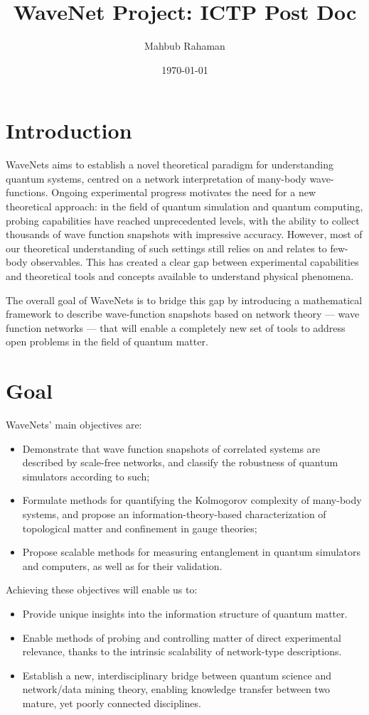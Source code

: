 \documentclass[a4paper, 11pt]{article}
\title{WaveNet Project: ICTP Post Doc}
\author{Mahbub Rahaman}
\date{\today}
\begin{document}
\maketitle

\section{Introduction}

WaveNets aims to establish a novel theoretical paradigm for understanding quantum systems, centred on a network interpretation of many-body wave-functions. Ongoing experimental progress motivates the need for a new theoretical approach: in the field of quantum simulation and quantum computing, probing capabilities have reached unprecedented levels, with the ability to collect thousands of wave function snapshots with impressive accuracy. However, most of our theoretical understanding of such settings still relies on and relates to few-body observables. This has created a clear gap between experimental capabilities and theoretical tools and concepts available to understand physical phenomena. 

The overall goal of WaveNets is to bridge this gap by introducing a mathematical framework to describe wave-function snapshots based on network theory — wave function networks —  that will enable a completely new set of tools to address open problems in the field of quantum matter.

\section{Goal}
WaveNets' main objectives are:

\begin{itemize}
    \item Demonstrate that wave function snapshots of correlated systems are described by scale-free networks, and classify the robustness of quantum simulators according to such;
    \item Formulate methods for quantifying the Kolmogorov complexity of many-body systems, and propose an information-theory-based characterization of topological matter and confinement in gauge theories;
    \item Propose scalable methods for measuring entanglement in quantum simulators and computers, as well as for their validation.
\end{itemize}
Achieving these objectives will enable us to:
\begin{itemize}
    \item Provide unique insights into the information structure of quantum matter.
    \item Enable methods of probing and controlling matter of direct experimental relevance, thanks to the intrinsic scalability of network-type descriptions.
    \item Establish a new, interdisciplinary bridge between quantum science and network/data mining theory, enabling knowledge transfer between two mature, yet poorly connected disciplines.
\end{itemize}
\end{document}
